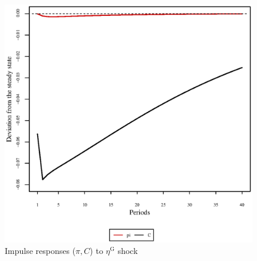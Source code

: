 \pagebreak

\begin{figure}[h]
\centering
\begin{minipage}{0.5\textwidth}
\vspace*{-3em}
\centering
\includegraphics[width=0.99\textwidth, scale=0.55]{plots/plot_80.eps}
\caption{Impulse responses ($\pi, C$) to $\eta^{\mathrm{G}}$ shock}
\end{minipage}
\end{figure}
